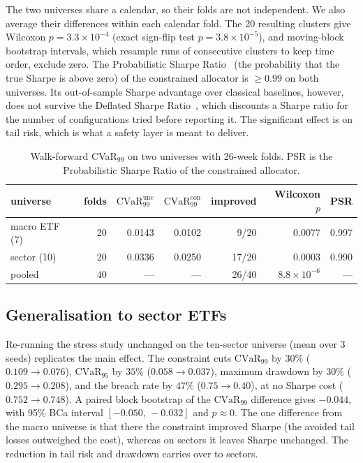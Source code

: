 \documentclass[sigconf]{acmart}
\begin{document}
The two universes share a calendar, so their folds are not independent. We also average their differences within each calendar fold. The 20 resulting clusters give Wilcoxon
$p=3.3\times10^{-4}$ (exact sign-flip test $p=3.8\times10^{-5}$), and moving-block bootstrap intervals, which
resample runs of consecutive clusters to keep time order, exclude zero. The Probabilistic Sharpe Ratio~\cite{bailey2012sharpe} (the
probability that the true Sharpe is above zero) of the constrained allocator is $\geq 0.99$ on
both universes. Its out-of-sample Sharpe advantage
over classical baselines, however, does not survive the Deflated Sharpe
Ratio~\cite{bailey2014deflated}, which discounts a Sharpe ratio for the number of configurations
tried before reporting it. The significant effect is on tail risk, which is what a safety layer
is meant to deliver.

\begin{table}[t]
\centering
\caption{Walk-forward CVaR$_{99}$ on two universes with 26-week folds. PSR is the Probabilistic Sharpe Ratio of the constrained allocator.}
\label{tab:stats}
\footnotesize
\setlength{\tabcolsep}{3pt}
\begin{tabular}{@{}lrrrrrr@{}}
\toprule
universe & folds & $\mathrm{CVaR}_{99}^{\text{unc}}$ & $\mathrm{CVaR}_{99}^{\text{con}}$ & improved & Wilcoxon $p$ & PSR \\
\midrule
macro ETF (7)   & 20 & 0.0143 & 0.0102 &  9/20 & 0.0077              & 0.997 \\
sector (10)     & 20 & 0.0336 & 0.0250 & 17/20 & 0.0003              & 0.990 \\
pooled & 40 & --- & --- & 26/40 & $8.8\times10^{-6}$ & --- \\
\bottomrule
\end{tabular}
\end{table}

\subsection{Generalisation to sector ETFs}
\label{sec:generalize}
Re-running the stress study unchanged on the ten-sector universe (mean over 3 seeds)
replicates the main effect. The constraint cuts $\mathrm{CVaR}_{99}$ by $30\%$
($0.109\!\to\!0.076$), $\mathrm{CVaR}_{95}$ by $35\%$ ($0.058\!\to\!0.037$), maximum drawdown by $30\%$
($0.295\!\to\!0.208$), and the breach rate by $47\%$ ($0.75\!\to\!0.40$), at
no Sharpe cost ($0.752\!\to\!0.748$). A paired block bootstrap of the
$\mathrm{CVaR}_{99}$ difference gives $-0.044$, with 95\% BCa interval
$[-0.050,\,-0.032]$ and $p\approx0$. The one difference from the macro universe is that
there the constraint improved Sharpe (the avoided tail losses outweighed the cost),
whereas on sectors it leaves Sharpe unchanged. The reduction in tail risk and drawdown
carries over to sectors.
\end{document}
